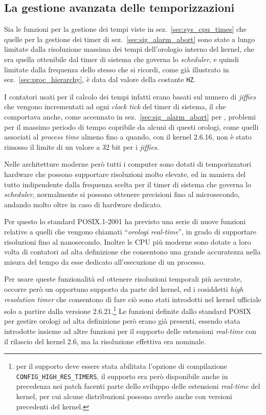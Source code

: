 \subsection{La gestione avanzata delle temporizzazioni}
\label{sec:sig_timer_adv}

Sia le funzioni per la gestione dei tempi viste in
sez.~\ref{sec:sys_cpu_times} che quelle per la gestione dei timer di
sez.~\ref{sec:sig_alarm_abort} sono state a lungo limitate dalla risoluzione
massima dei tempi dell'orologio interno del kernel, che era quella ottenibile
dal timer di sistema che governa lo \textit{scheduler}, e quindi limitate
dalla frequenza dello stesso che si ricordi, come già illustrato in
sez.~\ref{sec:proc_hierarchy}, è data dal valore della costante \texttt{HZ}. 

I contatori usati per il calcolo dei tempi infatti erano basati sul numero di
\textit{jiffies} che vengono incrementati ad ogni \textit{clock tick} del
timer di sistema, il che comportava anche, come accennato in
sez.~\ref{sec:sig_alarm_abort} per , problemi per il massimo
periodo di tempo copribile da alcuni di questi orologi, come quelli associati
al \textit{process time} almeno fino a quando, con il kernel 2.6.16, non è
stato rimosso il limite di un valore a 32 bit per i \textit{jiffies}.


Nelle architetture moderne però tutti i computer sono dotati di temporizzatori
hardware che possono supportare risoluzioni molto elevate, ed in maniera del
tutto indipendente dalla frequenza scelta per il timer di sistema che governa
lo \textit{scheduler}, normalmente si possono ottenere precisioni fino al
microsecondo, andando molto oltre in caso di hardware dedicato. 

Per questo lo standard POSIX.1-2001 ha previsto una serie di nuove funzioni
relative a quelli che vengono chiamati ``\textsl{orologi}
\textit{real-time}'', in grado di supportare risoluzioni fino al
nanosecondo. Inoltre le CPU più moderne sono dotate a loro volta di contatori
ad alta definizione che consentono una grande accuratezza nella misura del
tempo da esse dedicato all'esecuzione di un processo.

Per usare queste funzionalità ed ottenere risoluzioni temporali più accurate,
occorre però un opportuno supporto da parte del kernel, ed i cosiddetti
 \textit{high resolution timer} che
consentono di fare ciò sono stati introdotti nel kernel ufficiale solo a
partire dalla versione 2.6.21.\footnote{per il supporto deve essere stata
  abilitata l'opzione di compilazione \texttt{CONFIG\_HIGH\_RES\_TIMERS}, il
  supporto era però disponibile anche in precedenza nei patch facenti parte
  dello sviluppo delle estensioni \textit{real-time} del kernel, per cui
  alcune distribuzioni possono averlo anche con versioni precedenti del
  kernel.} Le funzioni definite dallo standard POSIX per gestire orologi ad
alta definizione però erano già presenti, essendo stata introdotte insieme ad
altre funzioni per il supporto delle estensioni \textit{real-time} con il
rilascio del kernel 2.6, ma la risoluzione effettiva era nominale.

